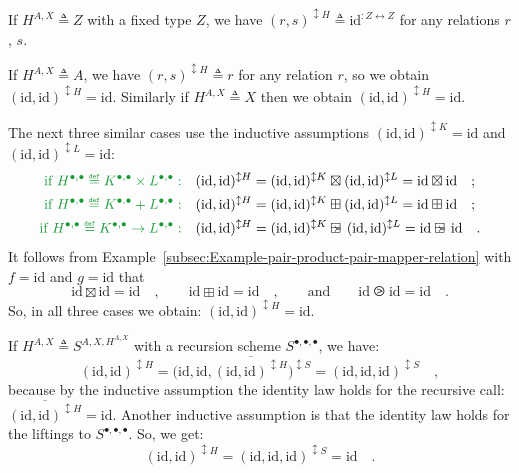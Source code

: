 If $H^{A,X}\triangleq Z$ with a fixed type $Z$, we have $(r,s)^{\updownarrow H}\triangleq\text{id}^{:Z\leftrightarrow Z}$
for any relations $r$, $s$.

If $H^{A,X}\triangleq A$, we have $(r,s)^{\updownarrow H}\triangleq r$
for any relation $r$, so we obtain $(\text{id},\text{id})^{\updownarrow H}=\text{id}$.
Similarly if $H^{A,X}\triangleq X$ then we obtain $(\text{id},\text{id})^{\updownarrow H}=\text{id}$.

The next three similar cases use the inductive assumptions $(\text{id},\text{id})^{\updownarrow K}=\text{id}$
and $(\text{id},\text{id})^{\updownarrow L}=\text{id}$:
\begin{align*}
{\color{greenunder}\text{if }H^{\bullet,\bullet}\triangleq K^{\bullet,\bullet}\times L^{\bullet,\bullet}:}\quad & (\text{id},\text{id})^{\updownarrow H}=(\text{id},\text{id})^{\updownarrow K}\boxtimes(\text{id},\text{id})^{\updownarrow L}=\text{id}\boxtimes\text{id}\quad;\\
{\color{greenunder}\text{if }H^{\bullet,\bullet}\triangleq K^{\bullet,\bullet}+L^{\bullet,\bullet}:}\quad & (\text{id},\text{id})^{\updownarrow H}=(\text{id},\text{id})^{\updownarrow K}\boxplus(\text{id},\text{id})^{\updownarrow L}=\text{id}\boxplus\text{id}\quad;\\
{\color{greenunder}\text{if }H^{\bullet,\bullet}\triangleq K^{\bullet,\bullet}\rightarrow L^{\bullet,\bullet}:}\quad & (\text{id},\text{id})^{\updownarrow H}=(\text{id},\text{id})^{\updownarrow K}\ogreaterthan(\text{id},\text{id})^{\updownarrow L}=\text{id}\ogreaterthan\text{id}\quad.
\end{align*}
It follows from Example~\ref{subsec:Example-pair-product-pair-mapper-relation}
with $f=\text{id}$ and $g=\text{id}$ that 
\[
\text{id}\boxtimes\text{id}=\text{id}\quad,\quad\quad\text{id}\boxplus\text{id}=\text{id}\quad,\quad\quad\text{and}\quad\quad\text{id}\ogreaterthan\text{id}=\text{id}\quad.
\]
So, in all three cases we obtain: $(\text{id},\text{id})^{\updownarrow H}=\text{id}$.

If $H^{A,X}\triangleq S^{A,X,H^{A,X}}$ with a recursion scheme $S^{\bullet,\bullet,\bullet}$,
we have:
\[
(\text{id},\text{id})^{\updownarrow H}=\big(\text{id},\text{id},\overline{(\text{id},\text{id})^{\updownarrow H}}\big)^{\updownarrow S}=(\text{id},\text{id},\text{id})^{\updownarrow S}\quad,
\]
because by the inductive assumption the identity law holds for the
recursive call: $\overline{(\text{id},\text{id})^{\updownarrow H}}=\text{id}$.
Another inductive assumption is that the identity law holds for the
liftings to $S^{\bullet,\bullet,\bullet}$. So, we get: 
\[
(\text{id},\text{id})^{\updownarrow H}=(\text{id},\text{id},\text{id})^{\updownarrow S}=\text{id}\quad.
\]

